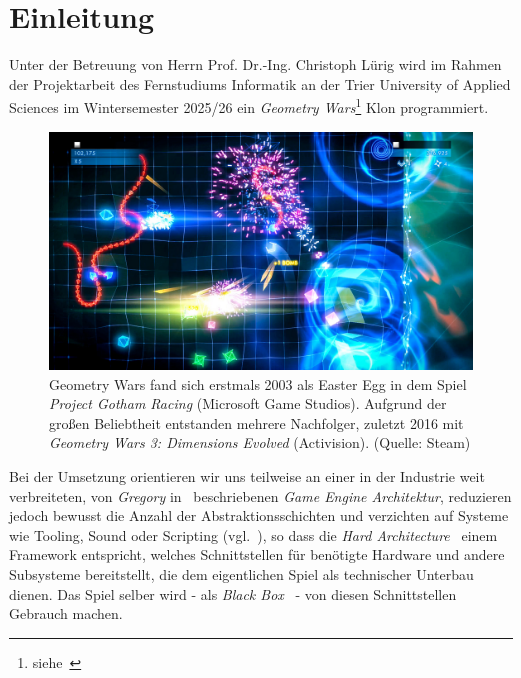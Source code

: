 \section{Einleitung}

Unter der Betreuung von Herrn Prof. Dr.-Ing. Christoph Lürig wird im Rahmen der Projektarbeit des Fernstudiums Informatik an der Trier University of Applied Sciences im Wintersemester 2025/26 ein \textit{Geometry Wars}\footnote{siehe~\cite[]{WikipediaGeometryWars}
} Klon programmiert.\\

\begin{figure}[!h]
    \centering
    \includegraphics[width=1\columnwidth]{img/geometry_wars}
    \caption{Geometry Wars fand sich erstmals 2003 als Easter Egg in dem Spiel \textit{Project Gotham Racing} (Microsoft Game Studios). Aufgrund der großen Beliebtheit entstanden mehrere Nachfolger, zuletzt 2016 mit \textit{Geometry Wars 3: Dimensions Evolved} (Activision). (Quelle: Steam)}
    \label{fig:geometry_wars}
\end{figure}

Bei der Umsetzung orientieren wir uns teilweise an einer in der Industrie weit verbreiteten, von \textit{Gregory} in~\cite[]{Gre19} beschriebenen \textit{Game Engine Architektur}, reduzieren jedoch bewusst die Anzahl der Abstraktionsschichten und verzichten auf Systeme wie Tooling, Sound oder Scripting (vgl.~\cite[\textbf{Figure 1.16}, 39]{Gre19}), so dass die \textit{Hard Architecture}~\cite[]{RM04} einem Framework entspricht, welches Schnittstellen für benötigte Hardware und andere Subsysteme bereitstellt, die dem eigentlichen Spiel als technischer Unterbau dienen.
Das Spiel selber wird - als \textit{Black Box}~\cite[]{RB88} - von diesen Schnittstellen Gebrauch machen.\\

